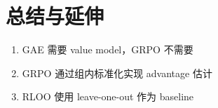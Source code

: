 \section{总结与延伸}
\begin{enumerate}
  \item GAE 需要 value model，GRPO 不需要
  \item GRPO 通过组内标准化实现 advantage 估计
  \item RLOO 使用 leave-one-out 作为 baseline
\end{enumerate}

